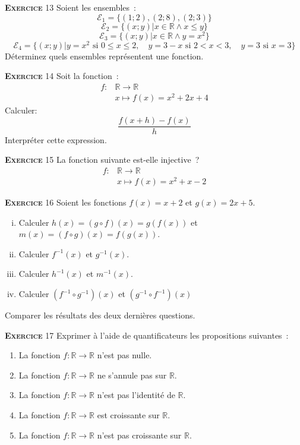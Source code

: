 \documentclass[10pt,a4paper,notitlepage]{article}
\newcommand{\exercice}[1]{\textsc{\textbf{Exercice}} #1}
\begin{document}
\bigskip

\exercice{13} Soient les ensembles :
\[
\mathcal E_1 = \{(1;2), (2;8), (2;3)\}
\]
\[
\mathcal E_2 = \{ (x;y) | x \in \mathbb R \land x\leq y \}
\]
\[
\mathcal E_3 = \{ (x;y) | x \in \mathbb R \land y = x^2 \}
\]
\[
\mathcal E_4 = \{ (x;y) | y = x^2 \text{ si } 0\leq x\leq 2,\quad
y=3-x  \text{ si } 2<x<3, \quad y=3 \text{ si } x=3\}
\]
Déterminez quels ensembles représentent une fonction.

\bigskip

\exercice{14} Soit la fonction :
\[
\begin{split}
  f: &\mathbb R \rightarrow \mathbb R\\
  &x \mapsto f(x) = x^2 + 2x + 4
\end{split}
\]
Calculer:
\[
\frac{f(x+h)-f(x)}{h}
\]
Interpréter cette expression.

\bigskip

\exercice{15} La fonction suivante est-elle injective ?
\[
\begin{split}
  f: &\mathbb R \rightarrow \mathbb R\\
  &x \mapsto f(x) = x^2 + x - 2
\end{split}
\]

\bigskip

\exercice{16} Soient les fonctions $f(x) = x+2$ et $g(x) = 2x + 5$.
\begin{enumerate}[(i)]
\item Calculer $h(x) = (g \circ f)(x) = g\left(f(x)\right)$ et $m(x) = (f \circ g)(x) = f\left(g(x)\right)$.
\item Calculer $f^{-1}(x)$ et $g^{-1}(x)$.
\item Calculer $h^{-1}(x)$ et $m^{-1}(x)$.
\item Calculer $\left(f^{-1} \circ g^{-1}\right)(x)$ et $\left(g^{-1} \circ f^{-1}\right)(x)$
\end{enumerate}
Comparer les résultats des deux dernières questions.

\bigskip

\exercice{17} Exprimer à l'aide de quantificateurs les propositions
suivantes :
\begin{enumerate}
\item La fonction $f: \mathbb R \rightarrow \mathbb R$ n'est pas
  nulle.
\item La fonction $f: \mathbb R \rightarrow \mathbb R$ ne s'annule pas
sur $\mathbb R$.
\item La fonction $f: \mathbb R \rightarrow \mathbb R$ n'est pas
  l'identité de $\mathbb R$.
\item La fonction $f: \mathbb R \rightarrow \mathbb R$ est croissante
  sur $\mathbb R$.
\item La fonction $f: \mathbb R \rightarrow \mathbb R$ n'est pas croissante
  sur $\mathbb R$.
\end{enumerate}
\end{document}
